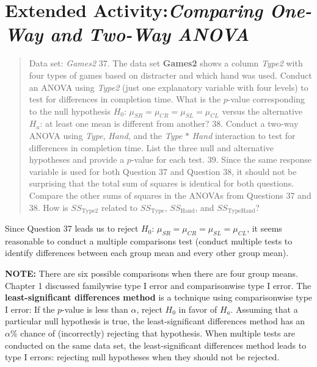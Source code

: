 \documentclass[
]{report}
\begin{document}
\hypertarget{extended-activitycomparing-one-way-and-two-way-anova}{%
\section*{\texorpdfstring{Extended Activity:\emph{Comparing One-Way and Two-Way ANOVA}}{Extended Activity:Comparing One-Way and Two-Way ANOVA}}\label{extended-activitycomparing-one-way-and-two-way-anova}}

\begin{quote}
Data set: \emph{Games2}
37. The data set \textbf{Games2} shows a column \emph{Type2} with four types of games based on distracter and which hand was used. Conduct an ANOVA using \emph{Type2} (just one explanatory variable with four levels) to test for differences in completion time. What is the \(p\)-value corresponding to the null hypothesis \(H_0\): \(\mu_{SR} = \mu_{CR} = \mu_{SL} = \mu_{CL}\) versus the alternative \(H_a\): at least one mean is different from another?
38. Conduct a two-way ANOVA using \emph{Type}, \emph{Hand}, and the \emph{Type} \(\ast\) \emph{Hand} interaction to test for differences in completion time. List the three null and alternative hypotheses and provide a \(p\)-value for each test.
39. Since the same response variable is used for both Question 37 and Question 38, it should not be surprising that the total sum of squares is identical for both questions. Compare the other sums of squares in the ANOVAs from Questions 37 and 38. How is \(SS_{\text{Type2}}\) related to \(SS_{\text{Type}}\), \(SS_{\text{Hand}}\), and \(SS_{\text{TypeHand}}\)?
\end{quote}

Since Question 37 leads us to reject \(H_0\): \(\mu_{SR} = \mu_{CR} = \mu_{SL} = \mu_{CL}\), it seems reasonable to conduct a multiple comparisons test (conduct multiple tests to identify differences between each group mean and every other group mean).

\large

\textbf{NOTE:}
There are six possible comparisons when there are four group means. Chapter 1 discussed familywise type I error and comparisonwise type I error. The \textbf{least-significant differences method} is a technique using comparisonwise type I error: If the \(p\)-value is less than \(\alpha\), reject \(H_0\) in favor of \(H_a\). Assuming that a particular null hypothesis is true, the least-significant differences method has an \(\alpha\%\) chance of (incorrectly) rejecting that hypothesis. When multiple tests are conducted on the same data set, the least-significant differences method leads to type I errors: rejecting null hypotheses when they should not be rejected.
\end{document}
